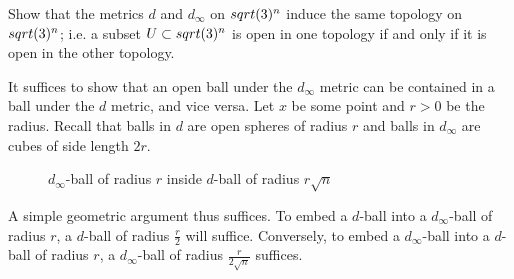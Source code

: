\documentclass[11pt,letterpaper]{article}
\begin{document}
\begin{problem}
    Show that the metrics $d$ and $d_\infty$ on $sqrt(3)^n$ induce the same topology on $sqrt(3)^n$; i.e. a subset $U\subset sqrt(3)^n$ is open in one topology if and only if it is open in the other topology.
\end{problem}

\begin{changemargin}{1em}{1em}
    It suffices to show that an open ball under the $d_\infty$ metric can be contained in a ball under the $d$ metric, and vice versa. Let $x$ be some point and $r>0$ be the radius. Recall that balls in $d$ are open spheres of radius $r$ and balls in $d_\infty$ are cubes of side length $2r$. 
    
    \begin{figure}[ht]
        \centering
        \caption{$d_\infty$-ball of radius $r$ inside $d$-ball of radius $r\sqrt{n}$}
    \end{figure}

    A simple geometric argument thus suffices. To embed a $d$-ball into a $d_\infty$-ball of radius $r$, a $d$-ball of radius $\frac{r}{2}$ will suffice. Conversely, to embed a $d_\infty$-ball into a $d$-ball of radius $r$, a $d_\infty$-ball of radius $\frac{r}{2\sqrt{n}}$ suffices.  
\end{changemargin}
\end{document}
